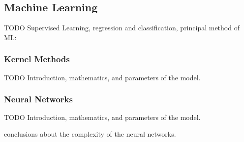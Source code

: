\subsection{Machine Learning}
TODO Supervised Learning, regression and classification, principal method of ML:
\subsubsection{Kernel Methods}
TODO Introduction, mathematics, and parameters of the model. 
\subsubsection{Neural Networks}
TODO Introduction, mathematics, and parameters of the model. 

conclusions about the complexity of the neural networks. 
